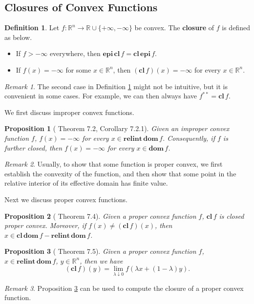 \documentclass[openany]{book}
\newtheorem{proposition}{Proposition}[chapter]
\theoremstyle{definition}
\newtheorem{definition}{Definition}[chapter]
\theoremstyle{remark}
\newtheorem*{remark}{Remark}
\begin{document}
\subsection{Closures of Convex Functions}
\begin{definition}\label{def:clFunc}
    Let $f:\mathbb{R}^n\to \mathbb{R}\cup\{+\infty,-\infty\}$ be convex. The \textbf{closure} of $f$ is defined as below.
    \begin{itemize}
        \item If $f>-\infty$ everywhere, then $\mathbf{epi}\,\mathbf{cl}\,f=\mathbf{cl}\,\mathbf{epi}\,f$.
        \item If $f(x)=-\infty$ for some $x\in \mathbb{R}^n$, then $(\mathbf{cl}\,f)(x)=-\infty$ for every $x\in \mathbb{R}^n$.
    \end{itemize}
\end{definition}
\begin{remark}
    The second case in Definition \ref{def:clFunc} might not be intuitive, but it is convenient in some cases. For example, we can then always have $f^{**}=\mathbf{cl}\,f$.
\end{remark}

We first discuss improper convex functions.
\begin{proposition}[\cite{R15} Theorem 7.2, Corollary 7.2.1]\label{thm:improperConvRelInt}
    Given an improper convex function $f$, $f(x)=-\infty$ for every $x\in \mathbf{relint}\,\mathbf{dom}\,f$. Consequently, if $f$ is further closed, then $f(x)=-\infty$ for every $x\in \mathbf{dom}\,f$.
\end{proposition}
\begin{remark}
    Usually, to show that some function is proper convex, we first establish the convexity of the function, and then show that some point in the relative interior of its effective domain has finite value.
\end{remark}

Next we discuss proper convex functions.
\begin{proposition}[\cite{R15} Theorem 7.4]
    Given a proper convex function $f$, $\mathbf{cl}\,f$ is closed proper convex. Moreover, if $f(x)\ne(\mathbf{cl}\,f)(x)$, then $x\in \mathbf{cl}\,\mathbf{dom}\,f-\mathbf{relint}\,\mathbf{dom}\,f$.
\end{proposition}
\begin{proposition}[\cite{R15} Theorem 7.5]\label{prop:clFuncBdVal}
    Given a proper convex function $f$, $x\in \mathbf{relint}\,\mathbf{dom}\,f$, $y\in \mathbb{R}^n$, then we have
    \begin{equation*}
        (\mathbf{cl}\,f)(y)=\lim_{\lambda\downarrow0}f(\lambda x+(1-\lambda)y).
    \end{equation*}
\end{proposition}
\begin{remark}
    Proposition \ref{prop:clFuncBdVal} can be used to compute the closure of a proper convex function.
\end{remark}
\end{document}
